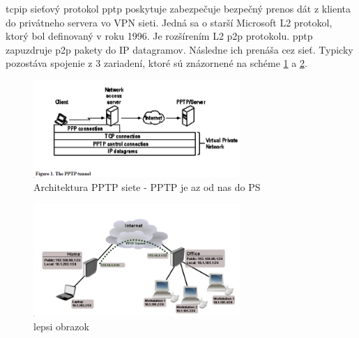 \acrshort{tcpip} sieťový protokol \acrshort{pptp} poskytuje zabezpečuje bezpečný prenos dát z klienta do privátneho servera vo VPN sieti. Jedná sa o starší Microsoft L2 protokol, ktorý bol definovaný v roku 1996. Je rozšírením L2 \acrshort{p2p} protokolu. \acrshort{pptp} zapuzdruje \acrshort{p2p} pakety do  IP datagramov. Následne ich prenáša cez sieť. Typicky pozostáva spojenie z 3 zariadení, ktoré sú znázornené na schéme \ref{ptptun} a \ref{pptpcon}. 

\begin{figure}[h]
	\centering
	\includegraphics[width=0.7\textwidth]{figures/ptptun}
	\caption{Architektura PPTP siete - PPTP je az od nas do PS}
	\label{ptptun}
\end{figure}
\begin{figure}[h]
	\centering
	\includegraphics[width=0.7\textwidth]{figures/pptpcon}
	\caption{lepsi obrazok}
	\label{pptpcon}
\end{figure}

